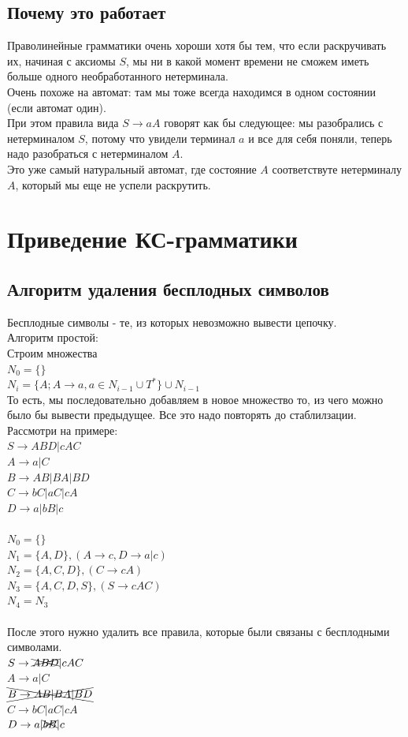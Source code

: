 \documentclass[14pt]{extreport}
\begin{document}
	\section{Почему это работает}
	Праволинейные грамматики очень хороши хотя бы тем, что если раскручивать их, начиная
	с аксиомы $S$, мы ни в какой момент времени не сможем иметь больше одного
	необработанного нетерминала.\\
	Очень похоже на автомат: там мы тоже всегда находимся в одном состоянии (если
	автомат один).\\
	При этом правила вида $S \to aA$ говорят как бы следующее: мы разобрались с нетерминалом
	$S$, потому что увидели терминал $a$ и все для себя поняли, теперь надо 
	разобраться с нетерминалом $A$.\\
	Это уже самый натуральный автомат, где состояние $A$ соответствуте нетерминалу $A$, который
	мы еще не успели раскрутить.
	
	
	\chapter{Приведение КС-грамматики}
	\section{Алгоритм удаления бесплодных символов}
	Бесплодные символы - те, из которых невозможно вывести цепочку.\\
	Алгоритм простой:\\
	Строим множества\\
	$N_0=\{\}$\\
	$N_i=\{A; A \to a, a \in N_{i-1} \cup T^*\} \cup N_{i-1}$\\
	То есть, мы последовательно добавляем в новое множество то, из чего можно было
	бы вывести предыдущее. Все это надо повторять до стаблилзации.\\
	Рассмотри на примере:\\
	$S \to ABD | cAC $\\
	$A \to a | C $\\
	$B \to AB | BA | BD $\\
	$C \to bC | aC | cA $\\
	$D \to a | bB | c$\\\\
	$N_0=\{\}$\\
	$N_1=\{A,D\}, (A \to c, D \to a | c)$\\
	$N_2=\{A,C,D\}, (C \to cA)$\\
	$N_3=\{A,C,D,S\}, (S \to cAC)$\\
	$N_4=N_3$\\\\
	После этого нужно удалить все правила, которые были связаны с бесплодными символами.\\
	$S \to \xcancel{ABD} | cAC $\\
	$A \to a | C $\\
	$\xcancel{B \to AB | BA | BD }$\\
	$C \to bC | aC | cA $\\
	$D \to a | \xcancel{bB} | c$\\\\
\end{document}
